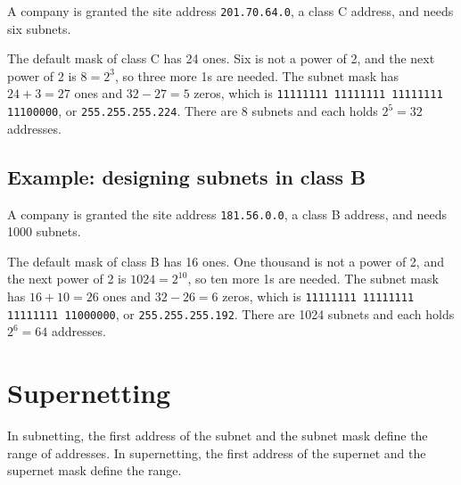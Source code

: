 \documentclass[11pt,a4paper]{article}
\begin{document}
A company is granted the site address \texttt{201.70.64.0}, a class C address, and needs six
subnets.

The default mask of class C has 24 ones. Six is not a power of 2, and the next power of 2 is
$8 = 2^{3}$, so three more 1s are needed. The subnet mask has $24 + 3 = 27$ ones and
$32 - 27 = 5$ zeros, which is \texttt{11111111 11111111 11111111 11100000}, or
\texttt{255.255.255.224}. There are 8 subnets and each holds $2^{5} = 32$ addresses.

\subsection*{Example: designing subnets in class B}

A company is granted the site address \texttt{181.56.0.0}, a class B address, and needs 1000
subnets.

The default mask of class B has 16 ones. One thousand is not a power of 2, and the next power
of 2 is $1024 = 2^{10}$, so ten more 1s are needed. The subnet mask has $16 + 10 = 26$ ones
and $32 - 26 = 6$ zeros, which is \texttt{11111111 11111111 11111111 11000000}, or
\texttt{255.255.255.192}. There are 1024 subnets and each holds $2^{6} = 64$ addresses.

\newpage
\section{Supernetting}




In subnetting, the first address of the subnet and the subnet mask define the range of
addresses. In supernetting, the first address of the supernet and the supernet mask define the
range.
\end{document}
